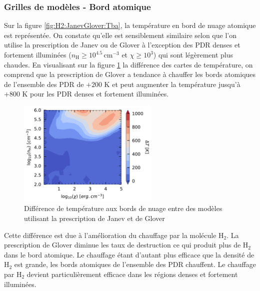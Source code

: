 \subsubsection{Grilles de modèles - Bord atomique}

Sur la figure \ref{fig:H2:JanevGlover:Tba}, la température en bord de nuage atomique est représentée. On constate qu'elle est sensiblement similaire selon que l'on utilise la prescription de Janev ou de Glover à l'exception des PDR denses et fortement illuminées ($n_\mathrm{H} \geq 10^{4.5} \, \mathrm{cm}^{-3}$ et $\chi \geq 10^3$) qui sont légèrement plus chaudes. En visualisant sur la figure \ref{fig:H2:JanevGlover:diffTba} la différence des cartes de température, on comprend que la prescription de Glover a tendance à chauffer les bords atomiques de l'ensemble des PDR de $+200$ K et peut augmenter la température jusqu'à $+800$ K pour les PDR denses et fortement illuminées. \newline

\begin{figure}[!h]
    \centering \includegraphics[trim = {0 0 0 0 },clip,width=0.6\textwidth]{figure/H2/diffgrid_gloverjanev/mapTba_H2_n_1p7_nobossion_noCl155_n.pdf}
    \caption{Différence de température aux bords de nuage entre des modèles utilisant la prescription de Janev et de Glover}
    \label{fig:H2:JanevGlover:diffTba}
\end{figure}

Cette différence est due à l'amélioration du chauffage par la molécule $\mathrm{H}_2$. La prescription de Glover diminue les taux de destruction ce qui produit plus de $\mathrm{H}_2$ dans le bord atomique. Le chauffage étant d'autant plus efficace que la densité de $\mathrm{H}_2$ est grande, les bords atomiques de l'ensemble des PDR chauffent. Le chauffage par $\mathrm{H}_2$ devient particulièrement efficace dans les régions denses et fortement illuminées. \newline

